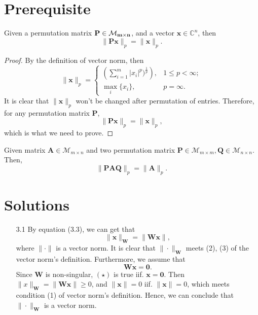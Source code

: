 \section{Prerequisite}
\begin{lemma}
Given a permutation matrix $\bf{P} \in \mathcal{M}_{m \times n}$, and a vector $\bm{x} \in \mathbb{C}^{n}$, then 
$$
    \|\bm{Px} \|_p = \|\bm{x} \|_p. 
$$
\begin{proof} 
By the definition of vector norm, then
$$
\|\bm{x}\|_p = \begin{cases}
\left(\sum_{i=1}^{m} |x_i|^{p})^{\frac{1}{p}}\right), & 1\leq p < \infty; \\
\max_{i} \{ x_i \}, & p = \infty .
\end{cases}
$$
It is clear that $\| \bm{x} \|_p$ won't be changed after permutation of entries. Therefore, for any permutation matrix $\bm{P}$,
$$
    \|\bm{Px} \|_p = \|\bm{x} \|_p,
$$
which is what we need to prove.
\end{proof}
\end{lemma}

\begin{corollary}
Given matrix $\bm{A} \in \mathcal{M}_{m\times n} $ and two permutation matrix $\bm{P} \in \mathcal{M}_{m \times m}, \bm{Q} \in \mathcal{M}_{n \times n}$. Then,
$$
\| \bm{PAQ}\|_{p} = \|  \bm{A} \|_{p}.
$$
\end{corollary}
\section{Solutions}
\begin{enumerate}
    \item[3.1] {
    By equation (3.3), we can get that
    $$
         \| \bm{x} \|_{\bm{W}} = \|\bm{Wx} \|,
    $$
    where $\| \cdot \|$ is a vector norm. It is clear that $\|\cdot \|_{\bm{W}}$ meets (2), (3) of the vector norm's definition. Furthermore, we assume that
    \begin{equation*}
    \bm{Wx} = \bm{0}.  \tag{$\star$}
    \end{equation*}
    }
    Since $\bm{W}$ is non-singular, $(\star)$ is true iif. $\bm{x} = \bm{0}$. Then $\| x\|_{\bm{W}} = \|\bm{Wx} \| \geq 0$, and $\| \bm{x} \|= 0 $ iif. $\| \bm{x} \| = 0$, which meets condition (1) of vector norm's definition. Hence, we can conclude that $\| \cdot \|_{\bm{W}}$ is a vector norm.
\end{enumerate}
